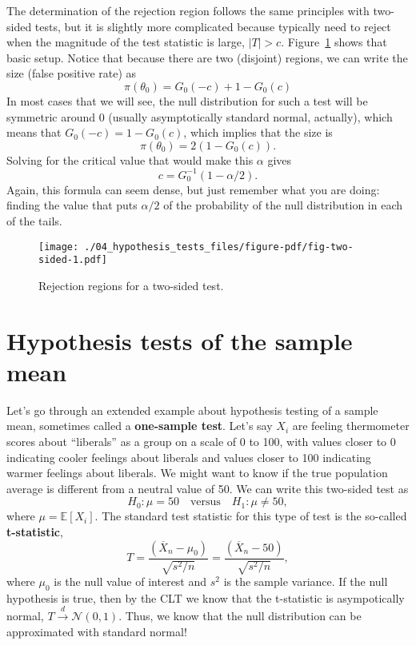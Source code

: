 \documentclass[
  letterpaper,
  DIV=11,
  numbers=noendperiod]{scrreprt}
\newcommand{\E}{\mathbb{E}}
\newcommand{\N}{\mathcal{N}}
\newcommand{\Xbar}{\overline{X}}
\newcommand{\indist}{\overset{d}{\to}}
\theoremstyle{definition}
\theoremstyle{plain}
\theoremstyle{definition}
\theoremstyle{remark}
\begin{document}
The determination of the rejection region follows the same principles
with two-sided tests, but it is slightly more complicated because
typically need to reject when the magnitude of the test statistic is
large, \(|T| > c\). Figure~\ref{fig-two-sided} shows that basic setup.
Notice that because there are two (disjoint) regions, we can write the
size (false positive rate) as \[ 
\pi(\theta_0) = G_0(-c) + 1 - G_0(c)
\] In most cases that we will see, the null distribution for such a test
will be symmetric around 0 (usually asymptotically standard normal,
actually), which means that \(G_0(-c) = 1 - G_0(c)\), which implies that
the size is \[ 
\pi(\theta_0) = 2(1 - G_0(c)).
\] Solving for the critical value that would make this \(\alpha\) gives
\[ 
c = G^{-1}_0(1 - \alpha/2).
\] Again, this formula can seem dense, but just remember what you are
doing: finding the value that puts \(\alpha/2\) of the probability of
the null distribution in each of the tails.

\begin{figure}

{\centering \texttt{[image: ./04\_hypothesis\_tests\_files/figure-pdf/fig-two-sided-1.pdf]}

}

\caption{\label{fig-two-sided}Rejection regions for a two-sided test.}

\end{figure}

\hypertarget{hypothesis-tests-of-the-sample-mean}{%
\section{Hypothesis tests of the sample
mean}\label{hypothesis-tests-of-the-sample-mean}}

Let's go through an extended example about hypothesis testing of a
sample mean, sometimes called a \textbf{one-sample test}. Let's say
\(X_i\) are feeling thermometer scores about ``liberals'' as a group on
a scale of 0 to 100, with values closer to 0 indicating cooler feelings
about liberals and values closer to 100 indicating warmer feelings about
liberals. We might want to know if the true population average is
different from a neutral value of 50. We can write this two-sided test
as \[
H_0: \mu = 50 \quad\text{versus}\quad H_1: \mu \neq 50,
\] where \(\mu = \E[X_i]\). The standard test statistic for this type of
test is the so-called \textbf{t-statistic}, \[ 
T = \frac{\left( \Xbar_n - \mu_0 \right)}{\sqrt{s^2 / n}} =\frac{\left( \Xbar_n - 50 \right)}{\sqrt{s^2 / n}},
\] where \(\mu_0\) is the null value of interest and \(s^2\) is the
sample variance. If the null hypothesis is true, then by the CLT we know
that the t-statistic is asympotically normal, \(T \indist \N(0, 1)\).
Thus, we know that the null distribution can be approximated with
standard normal!
\end{document}
